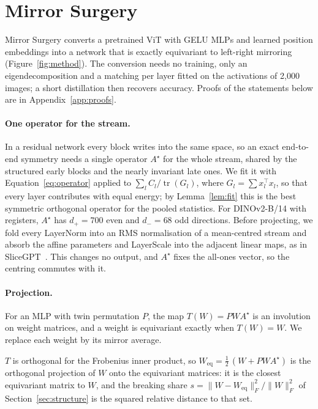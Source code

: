 \section{Mirror Surgery}
\label{sec:method}

Mirror Surgery converts a pretrained ViT with GELU MLPs and learned position embeddings into a network that is exactly
equivariant to left-right mirroring (Figure~\ref{fig:method}). The conversion needs no training, only an
eigendecomposition and a matching per layer fitted on the activations of 2{,}000 images; a short distillation then
recovers accuracy. Proofs of the statements below are in Appendix~\ref{app:proofs}.

\paragraph{One operator for the stream.}
In a residual network every block writes into the same space, so an exact end-to-end symmetry needs a single operator
$A^\star$ for the whole stream, shared by the structured early blocks and the nearly invariant late ones. We fit it with Equation~\eqref{eq:operator} applied to $\sum_l C_l / \operatorname{tr}(G_l)$,
where $G_l = \sum x_l^\top x_l$, so that every layer contributes with equal energy; by Lemma~\ref{lem:fit} this is the
best symmetric orthogonal operator for the pooled statistics. For DINOv2-B/14 with registers, $A^\star$ has $d_+ = 700$
even and $d_- = 68$ odd directions. Before projecting, we fold every LayerNorm into an RMS normalisation of a
mean-centred stream and absorb the affine parameters and LayerScale into the adjacent linear maps, as in
SliceGPT~\citep{ashkboos2024slicegpt}. This changes no output, and $A^\star$ fixes the all-ones vector, so the
centring commutes with it.

\paragraph{Projection.}
For an MLP with twin permutation $P$, the map $T(W) = P W A^\star$ is an involution on weight matrices, and a weight is
equivariant exactly when $T(W) = W$. We replace each weight by its mirror average.

\begin{proposition}\label{prop:projection}
$T$ is orthogonal for the Frobenius inner product, so $W_{\mathrm{eq}} = \tfrac12\,(W + P W A^\star)$ is the orthogonal
projection of $W$ onto the equivariant matrices: it is the closest equivariant matrix to $W$, and the breaking share
$s = \lVert W - W_{\mathrm{eq}}\rVert_F^2 / \lVert W\rVert_F^2$ of Section~\ref{sec:structure} is the squared relative
distance to that set.
\end{proposition}

